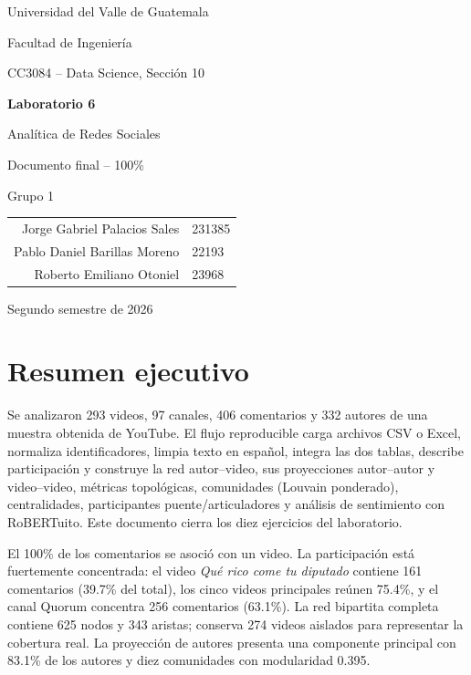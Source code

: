 \documentclass[11pt]{article}
\begin{document}
\hypersetup{pageanchor=false}
\begin{titlepage}
\pagecolor{navy}\color{white}
\centering
\vspace*{1.4cm}
{\Large Universidad del Valle de Guatemala\par}
\vspace{0.4cm}
{\large Facultad de Ingeniería\par}
{\large CC3084 -- Data Science, Sección 10\par}
\vfill
{\Huge\bfseries Laboratorio 6\par}
\vspace{0.3cm}
{\LARGE Analítica de Redes Sociales\par}
\vspace{0.9cm}
{\Large\color{teal!25!white}Documento final -- 100\%\par}
\vfill
{\large Grupo 1\par}
\vspace{0.5cm}
\begin{tabular}{rl}
Jorge Gabriel Palacios Sales & 231385\\
Pablo Daniel Barillas Moreno & 22193\\
Roberto Emiliano Otoniel & 23968\\
\end{tabular}
\vfill
{\large Segundo semestre de 2026\par}
\end{titlepage}
\nopagecolor\color{black}
\hypersetup{pageanchor=true}

\tableofcontents
\newpage

\section{Resumen ejecutivo}

Se analizaron 293 videos, 97 canales, 406 comentarios y 332 autores de una muestra obtenida de YouTube. El flujo reproducible carga archivos CSV o Excel, normaliza identificadores, limpia texto en español, integra las dos tablas, describe participación y construye la red autor--video, sus proyecciones autor--autor y video--video, métricas topológicas, comunidades (Louvain ponderado), centralidades, participantes puente/articuladores y análisis de sentimiento con RoBERTuito. Este documento cierra los diez ejercicios del laboratorio.

El 100\% de los comentarios se asoció con un video. La participación está fuertemente concentrada: el video \emph{Qué rico come tu diputado} contiene 161 comentarios (39.7\% del total), los cinco videos principales reúnen 75.4\%, y el canal Quorum concentra 256 comentarios (63.1\%). La red bipartita completa contiene 625 nodos y 343 aristas; conserva 274 videos aislados para representar la cobertura real. La proyección de autores presenta una componente principal con 83.1\% de los autores y diez comunidades con modularidad 0.395.
\end{document}
